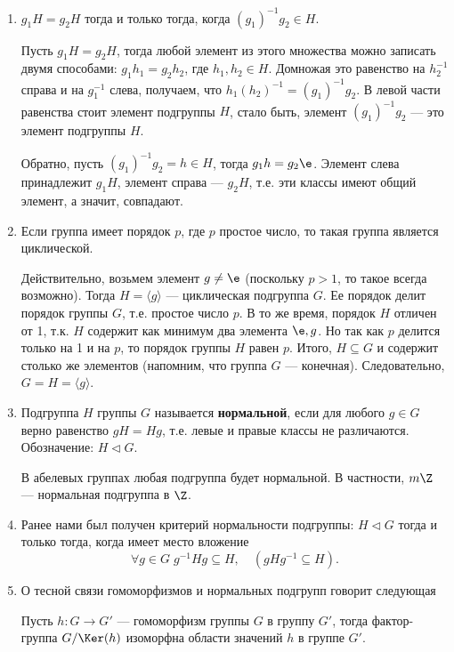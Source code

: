 \begin{enumerate}
\item $g_1H=g_2H$ тогда и только тогда, когда $(g_1)^{-1}g_2\in H$.

Пусть $g_1H=g_2H$, тогда любой элемент из этого множества можно записать двумя способами: $g_1h_1=g_2h_2$, где $h_1,h_2\in H$. Домножая это равенство на $h_2^{-1}$ справа и на $g_1^{-1}$ слева, получаем, что $h_1(h_2)^{-1}=(g_1)^{-1}g_2$. В левой части равенства стоит элемент подгруппы $H$, стало быть, элемент $(g_1)^{-1}g_2$ --- это элемент подгруппы $H$.

Обратно, пусть $(g_1)^{-1}g_2=h\in H$, тогда $g_1h=g_2\e$. Элемент слева принадлежит $g_1H$, элемент справа --- $g_2H$, т.е. эти классы имеют общий элемент, а значит, совпадают.

\item Если группа имеет порядок $p$, где $p$ простое число, то такая группа является циклической.

Действительно, возьмем элемент $g\ne\e$ (поскольку $p>1$, то такое всегда возможно). Тогда $H=\langle g\rangle$ --- циклическая подгруппа $G$. Ее порядок делит порядок группы $G$, т.е. простое число $p$. В то же время, порядок $H$ отличен от 1, т.к. $H$ содержит как минимум два элемента $\e,g$. Но так как $p$ делится только на 1 и на $p$, то порядок группы $H$ равен $p$. Итого, $H\subseteq G$ и содержит столько же элементов (напомним, что группа $G$ --- конечная). Следовательно, $G=H=\langle g\rangle$.




\item Подгруппа $H$ группы $G$ называется \textbf{нормальной}, если для любого $g\in G$ верно равенство $gH=Hg$, т.е. левые и правые классы не различаются. Обозначение: $H\vartriangleleft G$.

В абелевых группах любая подгруппа будет нормальной. В частности, $m\Z$ --- нормальная подгруппа в $\Z$.

\item Ранее нами был получен критерий нормальности подгруппы: $H\vartriangleleft G$ тогда и только тогда, когда имеет место вложение
$$
\forall g\in G\;g^{-1}Hg\subseteq H,\quad (gHg^{-1}\subseteq H).
$$



\item О тесной связи гомоморфизмов и нормальных подгрупп говорит следующая
\begin{thrm}
Пусть $h:G\to G'$ --- гомоморфизм группы $G$ в группу $G'$, тогда
фактор-группа $G/\Ker(h)$ изоморфна области значений $h$ в группе $G'$.


\end{thrm}
\end{enumerate}
